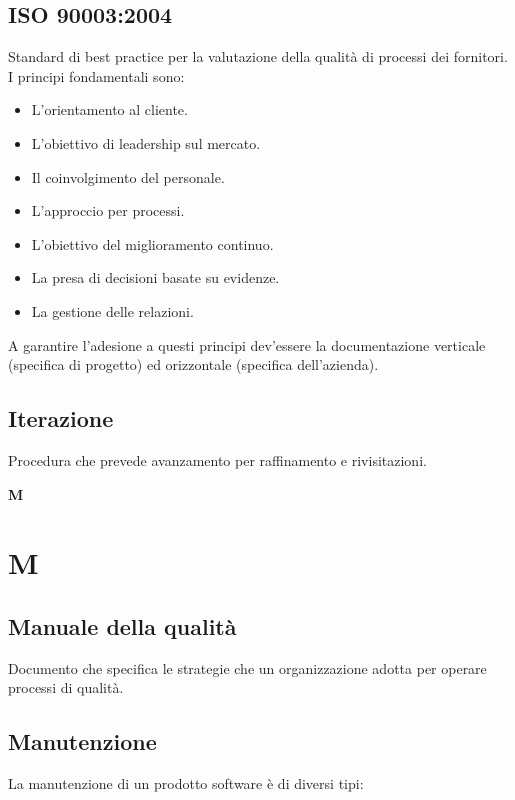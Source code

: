 	\subsection{ISO 90003:2004}
	\label{sec:iso90003}
	Standard di best practice per la valutazione della qualità di processi dei fornitori. I principi fondamentali sono:
	\begin{itemize}  
	\item L'orientamento al cliente.
	\item L'obiettivo di leadership sul mercato.
	\item Il coinvolgimento del personale.
	\item L'approccio per processi.
	\item L'obiettivo del miglioramento continuo.
	\item La presa di decisioni basate su evidenze.
	\item La gestione delle relazioni.
	\end{itemize}	
	A garantire l'adesione a questi principi dev'essere la documentazione verticale (specifica di progetto) ed orizzontale (specifica dell'azienda).	
	
	\subsection{Iterazione}
	\label{sec:iterazione}
	Procedura che prevede avanzamento per raffinamento e rivisitazioni.\newpage

	{\Huge{\textbf{M}}} \\
	\section{M}
	
	\subsection{Manuale della qualità}
	\label{sec:manualequalita}
	Documento che specifica le strategie che un organizzazione adotta per operare processi di qualità.
	
	
	\subsection{Manutenzione}
	\label{sec:manutenzione}
	La manutenzione di un prodotto software è di diversi tipi:
		
